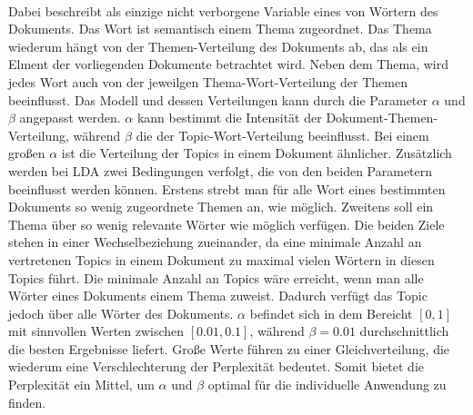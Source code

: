 \documentclass[german,version-2020-11]{uzl-thesis}
\begin{document}
\begin{center}
\end{center}\\

Dabei beschreibt  als einzige nicht verborgene Variable eines von  Wörtern des Dokuments. Das Wort ist semantisch einem Thema  zugeordnet. Das Thema wiederum hängt von der Themen-Verteilung  des Dokuments ab, das als ein Elment der  vorliegenden Dokumente betrachtet wird. Neben dem Thema, wird jedes Wort auch von der jeweilgen Thema-Wort-Verteilung \mathcal{\phi} der  Themen beeinflusst. Das Modell und dessen Verteilungen kann durch die Parameter $\alpha$ und $\beta$ angepasst werden. $\alpha$ kann bestimmt die Intensität der Dokument-Themen-Verteilung, während $\beta$ die der Topic-Wort-Verteilung beeinflusst. Bei einem großen $\alpha$ ist die Verteilung der Topics in einem Dokument ähnlicher. Zusätzlich werden bei LDA zwei Bedingungen verfolgt, die von den beiden Parametern beeinflusst werden können. Erstens strebt man für alle Wort eines bestimmten Dokuments so wenig zugeordnete Themen an, wie möglich. Zweitens soll ein Thema über so wenig relevante Wörter wie möglich verfügen. Die beiden Ziele stehen in einer Wechselbeziehung zueinander, da eine minimale Anzahl an vertretenen Topics in einem Dokument zu maximal vielen Wörtern in diesen Topics führt. Die minimale Anzahl an Topics wäre erreicht, wenn man alle Wörter eines Dokuments einem Thema zuweist. Dadurch verfügt das Topic jedoch über alle Wörter des Dokuments. $\alpha$ befindet sich in dem Bereicht $[0,1]$ mit sinnvollen Werten zwischen $[0.01, 0.1]$, während $\beta =0.01$ durchschnittlich die besten Ergebnisse liefert. Große Werte führen zu einer Gleichverteilung, die wiederum eine Verschlechterung der Perplexität bedeutet. Somit bietet die Perplexität ein Mittel, um $\alpha$ und $\beta$ optimal für die individuelle Anwendung zu finden. \\
\end{document}

